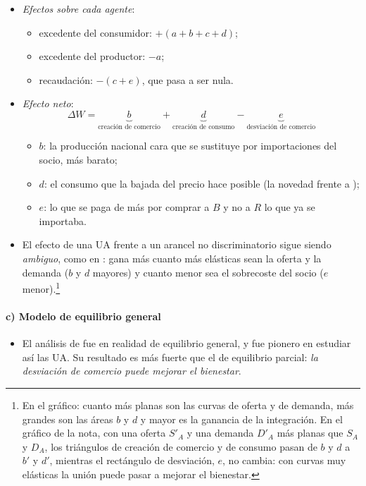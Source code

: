 \documentclass[11pt]{article}
\begin{document}
\begin{itemize}
\item \emph{Efectos sobre cada agente}:
  \begin{itemize}
  \item excedente del consumidor: $+(a+b+c+d)$;
  \item excedente del productor: $-a$;
  \item recaudación: $-(c+e)$, que pasa a ser nula.
  \end{itemize}
\item \emph{Efecto neto}:
  \[
  \Delta W=\underbrace{b}_{\text{creación de comercio}}+\underbrace{d}_{\text{creación de consumo}}-\underbrace{e}_{\text{desviación de comercio}}
  \]
  \begin{itemize}
  \item $b$: la producción nacional cara que se sustituye por importaciones del socio, más barato;
  \item $d$: el consumo que la bajada del precio hace posible (la novedad frente a );
  \item $e$: lo que se paga de más por comprar a $B$ y no a $R$ lo que ya se importaba.
  \end{itemize}
\item El efecto de una UA frente a un arancel no discriminatorio sigue siendo \emph{ambiguo}, como en : gana más cuanto más elásticas sean la oferta y la demanda ($b$ y $d$ mayores) y cuanto menor sea el sobrecoste del socio ($e$ menor).\footnote{En el gráfico: cuanto más planas son las curvas de oferta y de demanda, más grandes son las áreas $b$ y $d$ y mayor es la ganancia de la integración. En el gráfico de la nota, con una oferta $S'_A$ y una demanda $D'_A$ más planas que $S_A$ y $D_A$, los triángulos de creación de comercio y de consumo pasan de $b$ y $d$ a $b'$ y $d'$, mientras el rectángulo de desviación, $e$, no cambia: con curvas muy elásticas la unión puede pasar a mejorar el bienestar.}
\end{itemize}

\paragraph{c) Modelo de equilibrio general}

\begin{itemize}
\item El análisis de \textcite{Lipsey1957Theory} fue en realidad de equilibrio general, y fue pionero en estudiar así las UA. Su resultado es más fuerte que el de equilibrio parcial: \emph{la desviación de comercio puede mejorar el bienestar}.
\end{itemize}
\end{document}
